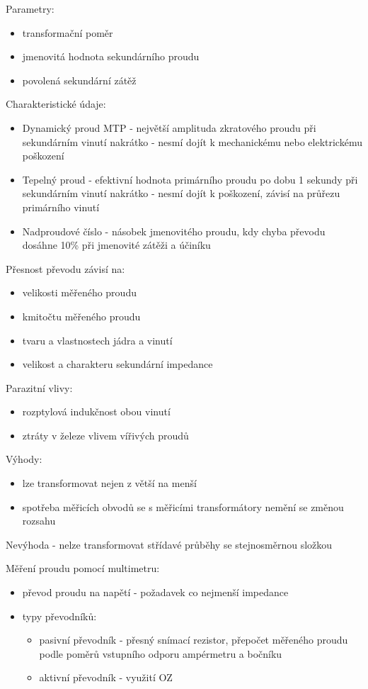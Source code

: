 Parametry:
\begin{itemize}
    \item transformační poměr
    \item jmenovitá hodnota sekundárního proudu
    \item povolená sekundární zátěž
\end{itemize}
Charakteristické údaje:
\begin{itemize}
    \item Dynamický proud MTP - největší amplituda zkratového proudu při sekundárním vinutí nakrátko - nesmí dojít k mechanickému nebo elektrickému poškození
    \item Tepelný proud - efektivní hodnota primárního proudu po dobu 1 sekundy při sekundárním vinutí nakrátko - nesmí dojít k poškození, závisí na průřezu primárního vinutí
    \item Nadproudové číslo - násobek jmenovitého proudu, kdy chyba převodu dosáhne 10\% při jmenovité zátěži a účiníku
\end{itemize}
Přesnost převodu závisí na:
\begin{itemize}
    \item velikosti měřeného proudu
    \item kmitočtu měřeného proudu
    \item tvaru a vlastnostech jádra a vinutí
    \item velikost a charakteru sekundární impedance
\end{itemize}
Parazitní vlivy:
\begin{itemize}
    \item rozptylová indukčnost obou vinutí
    \item ztráty v železe vlivem vířivých proudů
\end{itemize}
\newpage
Výhody:
\begin{itemize}
    \item lze transformovat nejen z větší na menší
    \item spotřeba měřicích obvodů se s měřicími transformátory nemění se změnou rozsahu
\end{itemize}
Nevýhoda - nelze transformovat střídavé průběhy se stejnosměrnou složkou

Měření proudu pomocí multimetru:
\begin{itemize}
    \item převod proudu na napětí - požadavek co nejmenší impedance
    \item typy převodníků:
          \begin{itemize}
              \item pasivní převodník - přesný snímací rezistor, přepočet měřeného proudu podle poměrů vstupního odporu ampérmetru a bočníku
              \item aktivní převodník - využití OZ
          \end{itemize}
\end{itemize}


